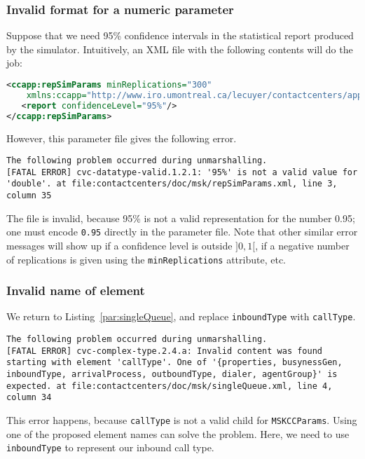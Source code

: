 \subsubsection{Invalid format for a numeric parameter}

Suppose that we need 95\% confidence intervals in the statistical
report produced by the simulator.
Intuitively, an XML file with the following contents will do the job:
\begin{lstlisting}[language=XML]
<ccapp:repSimParams minReplications="300"
    xmlns:ccapp="http://www.iro.umontreal.ca/lecuyer/contactcenters/app">
   <report confidenceLevel="95%"/>
</ccapp:repSimParams>
\end{lstlisting}
However, this parameter file gives the following error.
\begin{lstlisting}[language={},breaklines,prebreak={\char92}]
The following problem occurred during unmarshalling.
[FATAL ERROR] cvc-datatype-valid.1.2.1: '95%' is not a valid value for 'double'. at file:contactcenters/doc/msk/repSimParams.xml, line 3, column 35
\end{lstlisting}
The file is invalid, because 95\% is not a valid representation for
the number 0.95; one must encode \texttt{0.95} directly in the
parameter file.
Note that other similar error messages will show up if a confidence
level is outside $]0,1[$, if a negative number of replications is
given using the \texttt{min\-Replications} attribute, etc.

\subsubsection{Invalid name of element}

We return to Listing~\ref{par:singleQueue}, and replace
\texttt{inbound\-Type} with \texttt{call\-Type}.
\begin{lstlisting}[language={},breaklines,prebreak={\char92}]
The following problem occurred during unmarshalling.
[FATAL ERROR] cvc-complex-type.2.4.a: Invalid content was found starting with element 'callType'. One of '{properties, busynessGen, inboundType, arrivalProcess, outboundType, dialer, agentGroup}' is expected. at file:contactcenters/doc/msk/singleQueue.xml, line 4, column 34
\end{lstlisting}
This error happens, because \texttt{call\-Type} is not a valid child
for \texttt{MSKCCParams}. Using one of the proposed element names can
solve the problem.
Here, we need to use \texttt{inbound\-Type} to represent our inbound
call type.


